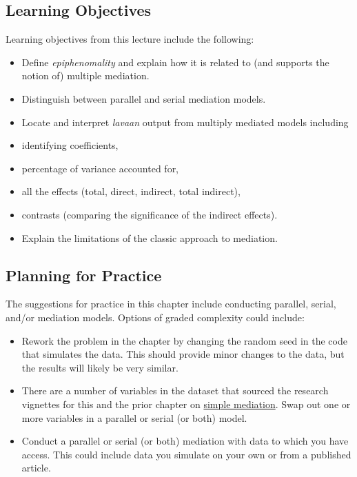 \documentclass[
  11pt,
]{book}
\providecommand{\tightlist}{%
  \setlength{\itemsep}{0pt}\setlength{\parskip}{0pt}}
\begin{document}
\hypertarget{learning-objectives-5}{%
\subsection{Learning Objectives}\label{learning-objectives-5}}

Learning objectives from this lecture include the following:

\begin{itemize}
\tightlist
\item
  Define \emph{epiphenomality} and explain how it is related to (and supports the notion of) multiple mediation.
\item
  Distinguish between parallel and serial mediation models.
\item
  Locate and interpret \emph{lavaan} output from multiply mediated models including
\item
  identifying coefficients,
\item
  percentage of variance accounted for,\\
\item
  all the effects (total, direct, indirect, total indirect),
\item
  contrasts (comparing the significance of the indirect effects).
\item
  Explain the limitations of the classic approach \citep{baron_moderator-mediator_1986} to mediation.
\end{itemize}

\hypertarget{planning-for-practice-5}{%
\subsection{Planning for Practice}\label{planning-for-practice-5}}

The suggestions for practice in this chapter include conducting parallel, serial, and/or mediation models. Options of graded complexity could include:

\begin{itemize}
\tightlist
\item
  Rework the problem in the chapter by changing the random seed in the code that simulates the data. This should provide minor changes to the data, but the results will likely be very similar.
\item
  There are a number of variables in the dataset that sourced the research vignettes for this and the prior chapter on \protect\hyperlink{SimpleMed}{simple mediation}. Swap out one or more variables in a parallel or serial (or both) model.
\item
  Conduct a parallel or serial (or both) mediation with data to which you have access. This could include data you simulate on your own or from a published article.
\end{itemize}
\end{document}
